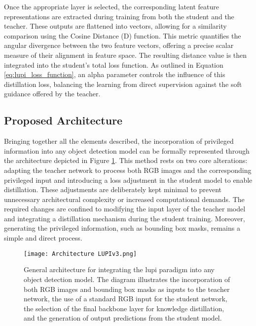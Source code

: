 Once the appropriate layer is selected, the corresponding latent feature representations are extracted during training from both the student and the teacher. These outputs are flattened into vectors, allowing for a similarity comparison using the Cosine Distance (\gls{D}) function. This metric quantifies the angular divergence between the two feature vectors, offering a precise scalar measure of their alignment in feature space. The resulting distance value is then integrated into the student’s total loss function. As outlined in Equation \ref{eq:lupi_loss_function}, an \gls{alpha} parameter controls the influence of this distillation loss, balancing the learning from direct supervision against the soft guidance offered by the teacher.

\subsection{Proposed Architecture}
\label{subsec:4_architecture}

Bringing together all the elements described, the incorporation of privileged information into any object detection model can be formally represented through the architecture depicted in Figure \ref{fig:lupi_architecture}. This method rests on two core alterations: adapting the teacher network to process both RGB images and the corresponding privileged input and introducing a loss adjustment in the student model to enable distillation. These adjustments are deliberately kept minimal to prevent unnecessary architectural complexity or increased computational demands. The required changes are confined to modifying the input layer of the teacher model and integrating a distillation mechanism during the student training. Moreover, generating the privileged information, such as bounding box masks, remains a simple and direct process.
\begin{figure}[ht]
    \centering
    \texttt{[image: Architecture LUPIv3.png]}
    \caption{General architecture for integrating the \gls{lupi} paradigm into any object detection model. The diagram illustrates the incorporation of both RGB images and bounding box masks as inputs to the teacher network, the use of a standard RGB input for the student network, the selection of the final backbone layer for knowledge distillation, and the generation of output predictions from the student model.}
    \label{fig:lupi_architecture}%
\end{figure}


